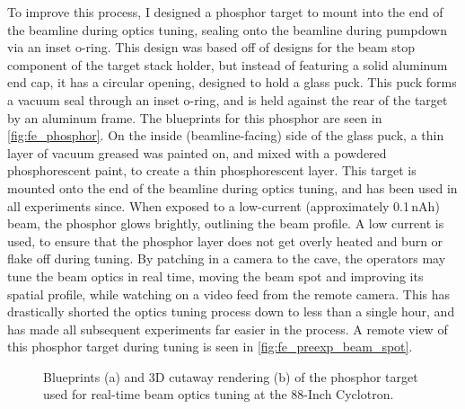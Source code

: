 To improve this process, I designed a phosphor target to mount into the end of the beamline during optics tuning, sealing onto the beamline during pumpdown via an inset o-ring.
This design was based off of designs for the beam stop component of the target stack holder, but instead of featuring a solid aluminum end cap, it has a circular opening, designed to hold a glass puck.
This puck forms a vacuum seal through an inset o-ring, and is held against the rear of the target by an aluminum frame.
The blueprints for this phosphor are seen in \autoref{fig:fe_phosphor}.
On the inside (beamline-facing) side of the glass puck, a thin layer of vacuum greased was painted on, and mixed with a powdered phosphorescent paint, to create a thin phosphorescent layer.
This target is mounted onto the end of the beamline during optics tuning, and has been used in all experiments since.
When exposed to a low-current (approximately 0.1\,nAh) beam, the phosphor glows brightly, outlining the beam profile.
A low current is used, to ensure that the phosphor layer does not get overly heated and burn or flake off during tuning.
By patching in a camera to the cave, the operators may tune the beam optics in real time, moving the beam spot and improving its spatial profile, while watching on a video feed from the remote camera.
This has drastically shorted the optics tuning process down to less than a single hour, and has made all subsequent experiments far easier in the process.
A remote view of this phosphor target during tuning is seen in \autoref{fig:fe_preexp_beam_spot}.



\begin{figure}
    \centering
    \caption{Blueprints (a) and 3D cutaway rendering (b) of the phosphor target used for real-time beam optics tuning at the 88-Inch Cyclotron.} 
     \label{fig:fe_phosphor}
\end{figure}



